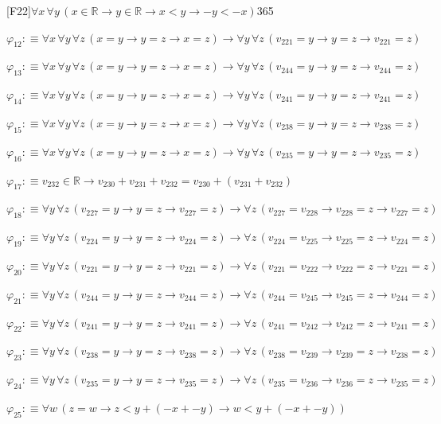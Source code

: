 \begin{fullproof}{[F22]}{$\forall x\,\forall y\,(x \in \mathbb{R} \to y \in \mathbb{R} \to x < y \to -y < -x)$}{365}
\begin{abbrevlist}
\item $\varphi_{12} :\equiv \forall x\,\forall y\,\forall z\,(x = y \to y = z \to x = z) \to \forall y\,\forall z\,(v_{221} = y \to y = z \to v_{221} = z)$
\item $\varphi_{13} :\equiv \forall x\,\forall y\,\forall z\,(x = y \to y = z \to x = z) \to \forall y\,\forall z\,(v_{244} = y \to y = z \to v_{244} = z)$
\item $\varphi_{14} :\equiv \forall x\,\forall y\,\forall z\,(x = y \to y = z \to x = z) \to \forall y\,\forall z\,(v_{241} = y \to y = z \to v_{241} = z)$
\item $\varphi_{15} :\equiv \forall x\,\forall y\,\forall z\,(x = y \to y = z \to x = z) \to \forall y\,\forall z\,(v_{238} = y \to y = z \to v_{238} = z)$
\item $\varphi_{16} :\equiv \forall x\,\forall y\,\forall z\,(x = y \to y = z \to x = z) \to \forall y\,\forall z\,(v_{235} = y \to y = z \to v_{235} = z)$
\item $\varphi_{17} :\equiv v_{232} \in \mathbb{R} \to v_{230} + v_{231} + v_{232} = v_{230} + (v_{231} + v_{232})$
\item $\varphi_{18} :\equiv \forall y\,\forall z\,(v_{227} = y \to y = z \to v_{227} = z) \to \forall z\,(v_{227} = v_{228} \to v_{228} = z \to v_{227} = z)$
\item $\varphi_{19} :\equiv \forall y\,\forall z\,(v_{224} = y \to y = z \to v_{224} = z) \to \forall z\,(v_{224} = v_{225} \to v_{225} = z \to v_{224} = z)$
\item $\varphi_{20} :\equiv \forall y\,\forall z\,(v_{221} = y \to y = z \to v_{221} = z) \to \forall z\,(v_{221} = v_{222} \to v_{222} = z \to v_{221} = z)$
\item $\varphi_{21} :\equiv \forall y\,\forall z\,(v_{244} = y \to y = z \to v_{244} = z) \to \forall z\,(v_{244} = v_{245} \to v_{245} = z \to v_{244} = z)$
\item $\varphi_{22} :\equiv \forall y\,\forall z\,(v_{241} = y \to y = z \to v_{241} = z) \to \forall z\,(v_{241} = v_{242} \to v_{242} = z \to v_{241} = z)$
\item $\varphi_{23} :\equiv \forall y\,\forall z\,(v_{238} = y \to y = z \to v_{238} = z) \to \forall z\,(v_{238} = v_{239} \to v_{239} = z \to v_{238} = z)$
\item $\varphi_{24} :\equiv \forall y\,\forall z\,(v_{235} = y \to y = z \to v_{235} = z) \to \forall z\,(v_{235} = v_{236} \to v_{236} = z \to v_{235} = z)$
\item $\varphi_{25} :\equiv \forall w\,(z = w \to z < y + (-x + -y) \to w < y + (-x + -y))$

\end{abbrevlist}
\end{fullproof}
